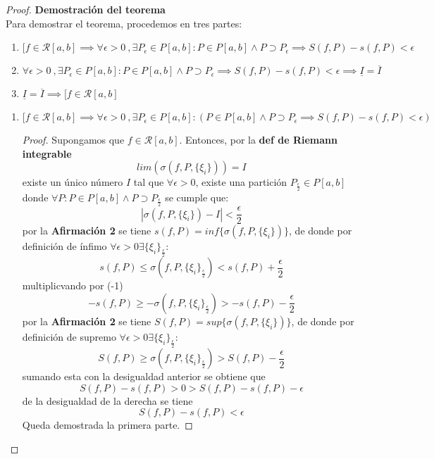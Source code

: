 \documentclass{article}
\begin{document}
\begin{proof}\textbf{Demostración del teorema}\\

Para demostrar el teorema, procedemos en tres partes:
\begin{enumerate}
\item \([f \in \mathcal{R}[a, b] \implies \forall \epsilon>0\ ,  \exists P_\epsilon \in P[a, b]: P \in P[a, b] \wedge P \supset P_\epsilon \implies S(f, P) - s(f, P) < \epsilon\)
\item  \(\forall \epsilon>0\ ,  \exists P_\epsilon \in P[a, b]: P \in P[a, b] \wedge P \supset P_\epsilon \implies S(f, P) - s(f, P) < \epsilon \implies \underline{I} = \overline{I}\)
\item \(\underline{I} = \overline{I} \implies [f \in \mathcal{R}[a, b]\)
\end{enumerate}
\begin{enumerate}
  \item \([f \in \mathcal{R}[a, b] \implies \forall \epsilon>0\ ,  \exists P_\epsilon \in P[a, b]: (P \in P[a, b] \wedge P \supset P_\epsilon \implies S(f, P) - s(f, P) < \epsilon)\)
\begin{proof}

 Supongamos que \( f  \in \mathcal{R}[a, b]\). Entonces, por la \textbf{def de Riemann integrable}
\[
lim(\sigma(f, P,\{\xi_i\})) = I
\]
existe un único número \( I \) tal que \( \forall \epsilon > 0 \), existe una partición \( P_\frac{\epsilon}{2} \in P[a, b]\)  donde \(\forall P: P \in P[a, b] \wedge P \supset P_\frac{\epsilon}{2}\) se cumple que:
    \[
    |\sigma(f, P,\{\xi_i\}) - I| < \frac\epsilon2
    \]
por la \textbf{Afirmación 2} se tiene \(s(f, P) = inf\{\sigma(f, P,\{\xi_i\})\}\), de donde por definición de ínfimo
\( \forall \epsilon> 0 \exists \{\xi_i\}_\frac{\epsilon}{2}:\)
\[
s(f, P) \leq \sigma(f, P,\{\xi_i\}_\frac{\epsilon}{2}) < s(f, P) + \frac{\epsilon}{2}
\]
multiplicvando por (-1)
\[
-s(f, P) \geq -\sigma(f, P,\{\xi_i\}_\frac{\epsilon}{2}) > -s(f, P) - \frac{\epsilon}{2}
\]
por la \textbf{Afirmación 2} se tiene \(S(f, P) = sup\{\sigma(f, P,\{\xi_i\})\}\), de donde por definición de supremo 
\( \forall \epsilon> 0 \exists \{\xi_i\}_\frac{\epsilon}{2}:\)
\[
S(f, P) \geq \sigma(f, P,\{\xi_i\}_\frac{\epsilon}{2}) > S(f, P) - \frac{\epsilon}{2}
\]
sumando esta con la desigualdad anterior se obtiene que
\[
S(f,P) - s(f,P) > 0 > S(f, P) - s(f, P) - \epsilon
\]
 de la desigualdad de la derecha se tiene
\[
S(f, P) - s(f, P) < \epsilon
\]
Queda demostrada la primera parte.


\end{proof}
\end{enumerate}
\end{proof}
\end{document}
